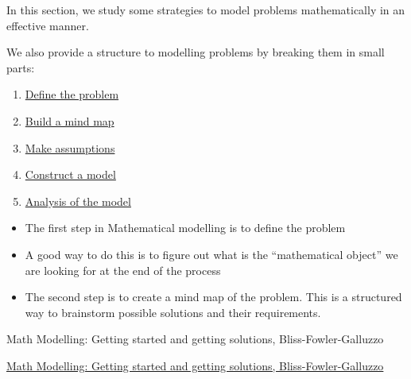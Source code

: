 
%
%


\begin{topic}


In this section, we study some strategies to model problems mathematically in an effective manner.

We also provide a structure to modelling problems by breaking them in small parts:

\begin{enumerate}[label={\bf \Alph*.}]
	\item \hyperref[define]{Define the problem}
	\item \hyperref[mindmap]{Build a mind map}
	\item \hyperref[assumptions]{Make assumptions}
	\item \hyperref[model]{Construct a model}
	\item \hyperref[analysis]{Analysis of the model}
\end{enumerate}



\end{topic}


\begin{module}

	\begin{itemize}
		\item The first step in Mathematical modelling is to define the problem
		\item A good way to do this is to figure out what is the ``mathematical object'' we are looking for at the end of the process

		\item The second step is to create a mind map of the problem. This is a structured way to brainstorm possible solutions and their requirements.
	\end{itemize}
	

\begin{annotation}
	\begin{goals}
	Math Modelling: Getting started and getting solutions, Bliss-Fowler-Galluzzo
	
	\hfill {}	
	\end{goals}
\end{annotation}
	 \href{https://m3challenge.siam.org/resources/modeling-handbook}{Math Modelling: Getting started and getting solutions, Bliss-Fowler-Galluzzo}

\end{module}





